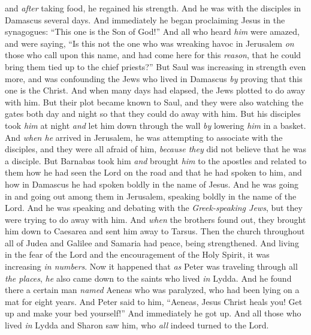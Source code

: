 \begin{biblechapter}
\verse and \textit{after} taking food, he regained his strength. And he was with the disciples in Damascus several days.
 And immediately he began proclaiming Jesus in the synagogues: “This one is the Son of God!”
\verse And all who heard \textit{him} were amazed, and were saying, “Is this not the one who was wreaking havoc in Jerusalem \textit{on} those who call upon this name, and had come here for this \textit{reason}, that he could bring them tied up to the chief priests?”
\verse But Saul was increasing in strength even more, and was confounding the Jews who lived in Damascus \textit{by} proving that this one is the Christ.
\verse And when many days had elapsed, the Jews plotted to do away with him.
\verse But their plot became known to Saul, and they were also watching the gates both day and night so that they could do away with him.
\verse But his disciples took \textit{him} at night \textit{and} let him down through the wall \textit{by} lowering \textit{him} in a basket.
 And \textit{when he} arrived in Jerusalem, he was attempting to associate with the disciples, and they were all afraid of him, \textit{because they} did not believe that he was a disciple.
\verse But Barnabas took him \textit{and} brought \textit{him} to the apostles and related to them how he had seen the Lord on the road and that he had spoken to him, and how in Damascus he had spoken boldly in the name of Jesus.
\verse And he was going in and going out among them in Jerusalem, speaking boldly in the name of the Lord.
\verse And he was speaking and debating with the \textit{Greek-speaking Jews}, but they were trying to do away with him.
\verse And \textit{when} the brothers found out, they brought him down to Caesarea and sent him away to Tarsus.
\verse Then the church throughout all of Judea and Galilee and Samaria had peace, being strengthened. And living in the fear of the Lord and the encouragement of the Holy Spirit, it was increasing \textit{in numbers}.
 Now it happened that \textit{as} Peter was traveling through all \textit{the places}, \textit{he} also came down to the saints who lived \textit{in} Lydda.
\verse And he found there a certain man \textit{named} Aeneas who was paralyzed, who had been lying on a mat for eight years.
\verse And Peter said to him, “Aeneas, Jesus Christ heals you! Get up and make your bed yourself!” And immediately he got up.
\verse And all those who lived \textit{in} Lydda and Sharon saw him, who \textit{all} indeed turned to the Lord.

\end{biblechapter}
